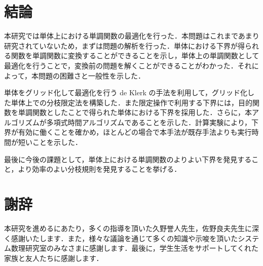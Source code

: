 \documentclass[a4paper,11pt]{jreport}
\begin{document}
\chapter{結論}

本研究では単体上における単調関数の最適化を行った．本問題はこれまであまり研究されていないため，まずは問題の解析を行った．単体における下界が得られる関数を単調関数に変換することができることを示し，単体上の単調関数として最適化を行うことで，変換前の問題を解くことができることがわかった．それによって，本問題の困難さと一般性を示した．\par
単体をグリッド化して最適化を行う de Klerk の手法を利用して，グリッド化した単体上での分枝限定法を構築した．また限定操作で利用する下界には，目的関数を単調関数としたことで得られた単体における下界を採用した．さらに，本アルゴリズムが多項式時間アルゴリズムであることを示した．計算実験により，下界が有効に働くことを確かめ，ほとんどの場合で本手法が既存手法よりも実行時間が短いことを示した．\par
最後に今後の課題として，単体上における単調関数のよりよい下界を発見すること，より効率のよい分枝規則を発見することを挙げる．\par

\chapter*{謝辞}

本研究を進めるにあたり，多くの指導を頂いた久野誉人先生，佐野良夫先生に深く感謝いたします．また，様々な議論を通じて多くの知識や示唆を頂いたシステム数理研究室のみなさまに感謝します．最後に，学生生活をサポートしてくれた家族と友人たちに感謝します．

\newpage

\renewcommand{\bibname}{参考文献}
\end{document}
